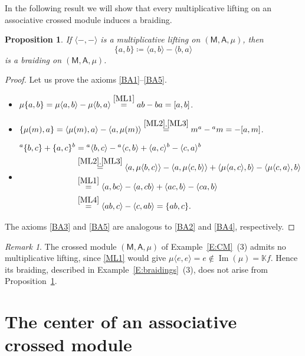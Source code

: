 \documentclass[12pt,reqno]{amsart}
\theoremstyle{plain}
\newtheorem{proposition}[theorem]{Proposition}
\theoremstyle{definition}
\theoremstyle{remark}
\newtheorem{remark}[theorem]{Remark}
\def\Im{\operatorname{Im}}
\newcommand{\K}{\ensuremath{\mathbb{K}}}
\newcommand{\A}{\ensuremath{\mathsf{A}}}
\newcommand{\MM}{\ensuremath{\mathsf{M}}}
\numberwithin{equation}{section}
\begin{document}
In the following result we will show that every multiplicative lifting on an associative crossed module induces a braiding.
\begin{proposition}\label{P:ml-braiding}
	If $\langle-,-\rangle$ is a multiplicative lifting on $(\MM,\A,\mu)$, then
	\[
	\{a,b\} \coloneqq \langle a,b \rangle-\langle b,a\rangle
	\]
	is a braiding on $(\MM,\A,\mu)$.
\end{proposition}
\begin{proof} Let us prove the axioms \eqref{BA1}--\eqref{BA5}.
	\begin{itemize}
		\item[\eqref{BA1}:]$\mu\{a,b\}=\mu\langle a,b \rangle-\mu\langle b,a \rangle\stackrel{\eqref{ML1}}{=}ab-ba=[a,b]$.
		\item[\eqref{BA2}:]$\{\mu(m),a\}=\langle\mu(m),a\rangle-\langle a,\mu(m)\rangle\stackrel{\eqref{ML2},\eqref{ML3}}{=}m^{a}-{}^{a}m=-[a,m]$.
		\item[\eqref{BA4}:]
		\begin{align*}
			{}^{a}\{b,c\}+\{a,c\}^{b} & = {}^{a}\langle b,c\rangle -{}^{a}\langle c,b\rangle+\langle a,c\rangle^{b}-\langle c,a\rangle^{b}\\
			&\stackrel{\eqref{ML2},\eqref{ML3}}{=} \langle a,\mu\langle b,c\rangle\rangle-\langle a,\mu\langle c,b\rangle\rangle+\langle\mu\langle a,c\rangle,b\rangle -\langle\mu\langle c,a\rangle,b\rangle \\
			& \stackrel{\eqref{ML1}}{=} \langle a,bc\rangle-\langle a,cb\rangle+\langle ac,b\rangle -\langle ca,b\rangle\\
			& \stackrel{\eqref{ML4}}{=} \langle ab,c\rangle -\langle c,ab\rangle=\{ab,c\}.
		\end{align*} 
	\end{itemize}
	The axioms \eqref{BA3} and \eqref{BA5} are analogous to \eqref{BA2} and \eqref{BA4}, respectively.
\end{proof}

\begin{remark}\label{R:noML}
	The crossed module $(\MM,\A,\mu)$ of Example~\ref{E:CM}~(3) admits no multiplicative lifting, since \eqref{ML1} would give $\mu\langle e,e\rangle=e\notin\Im(\mu)=\K f$.
	 Hence its braiding, described in Example~\ref{E:braidings}~(3), does not arise from Proposition~\ref{P:ml-braiding}.
\end{remark}


\section{The center of an associative crossed module}\label{S:center}
\end{document}
